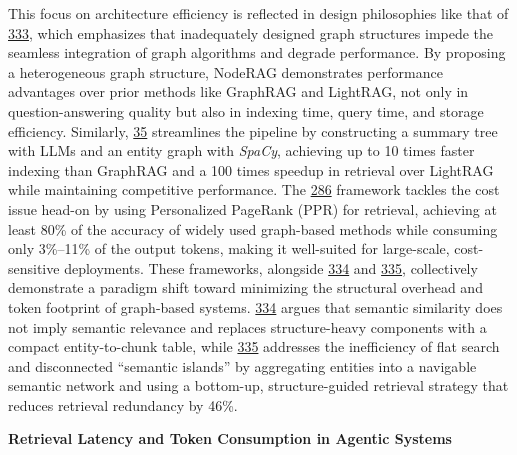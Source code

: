 \documentclass[11pt]{article}
\begin{document}
This focus on architecture efficiency is reflected in design philosophies like that of \href{NodeRAG\%20Structuring\%20Graph-based\%20RAG\%20with\%20Heterogeneous\%20Nodes}{333}, which emphasizes that inadequately designed graph structures impede the seamless integration of graph algorithms and degrade performance. By proposing a heterogeneous graph structure, NodeRAG demonstrates performance advantages over prior methods like GraphRAG and LightRAG, not only in question-answering quality but also in indexing time, query time, and storage efficiency. Similarly, \href{E\%5E2GraphRAG\%20Streamlining\%20Graph-based\%20RAG\%20for\%20High\%20Efficiency\%20and\%20Effectiveness}{35} streamlines the pipeline by constructing a summary tree with LLMs and an entity graph with \emph{SpaCy}, achieving up to 10 times faster indexing than GraphRAG and a 100 times speedup in retrieval over LightRAG while maintaining competitive performance. The \href{TERAG\%20Token-Efficient\%20Graph-Based\%20Retrieval-Augmented\%20Generation}{286} framework tackles the cost issue head-on by using Personalized PageRank (PPR) for retrieval, achieving at least 80\% of the accuracy of widely used graph-based methods while consuming only 3\%--11\% of the output tokens, making it well-suited for large-scale, cost-sensitive deployments. These frameworks, alongside \href{SlimRAG\%20Retrieval\%20without\%20Graphs\%20via\%20Entity-Aware\%20Context\%20Selection}{334} and \href{LeanRAG\%20Knowledge-Graph-Based\%20Generation\%20with\%20Semantic\%20Aggregation\%20and\%20Hierarchical\%20Retrieval}{335}, collectively demonstrate a paradigm shift toward minimizing the structural overhead and token footprint of graph-based systems. \href{SlimRAG\%20Retrieval\%20without\%20Graphs\%20via\%20Entity-Aware\%20Context\%20Selection}{334} argues that semantic similarity does not imply semantic relevance and replaces structure-heavy components with a compact entity-to-chunk table, while \href{LeanRAG\%20Knowledge-Graph-Based\%20Generation\%20with\%20Semantic\%20Aggregation\%20and\%20Hierarchical\%20Retrieval}{335} addresses the inefficiency of flat search and disconnected ``semantic islands'' by aggregating entities into a navigable semantic network and using a bottom-up, structure-guided retrieval strategy that reduces retrieval redundancy by 46\%.

\textbf{Retrieval Latency and Token Consumption in Agentic Systems}
\end{document}
